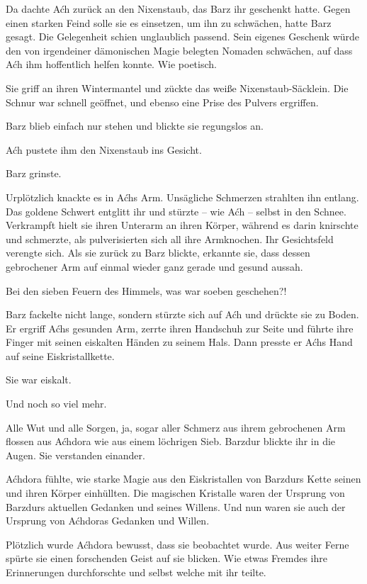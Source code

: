 Da dachte Aćh zurück an den Nixenstaub, das Barz ihr geschenkt hatte. Gegen einen starken Feind solle sie es einsetzen, um ihn zu schwächen, hatte Barz gesagt. Die Gelegenheit schien unglaublich passend. Sein eigenes Geschenk würde den von irgendeiner dämonischen Magie belegten Nomaden schwächen, auf dass Aćh ihm hoffentlich helfen konnte. Wie poetisch.

Sie griff an ihren Wintermantel und zückte das weiße Nixenstaub-Säcklein. Die Schnur war schnell geöffnet, und ebenso eine Prise des Pulvers ergriffen.

Barz blieb einfach nur stehen und blickte sie regungslos an.

Aćh pustete ihm den Nixenstaub ins Gesicht.

Barz grinste.

Urplötzlich knackte es in Aćhs Arm. Unsägliche Schmerzen strahlten ihn entlang. Das goldene Schwert entglitt ihr und stürzte – wie Aćh – selbst in den Schnee. Verkrampft hielt sie ihren Unterarm an ihren Körper, während es darin knirschte und schmerzte, als pulverisierten sich all ihre Armknochen. Ihr Gesichtsfeld verengte sich. Als sie zurück zu Barz blickte, erkannte sie, dass dessen gebrochener Arm auf einmal wieder ganz gerade und gesund aussah.

Bei den sieben Feuern des Himmels, was war soeben geschehen?!

Barz fackelte nicht lange, sondern stürzte sich auf Aćh und drückte sie zu Boden. Er ergriff Aćhs gesunden Arm, zerrte ihren Handschuh zur Seite und führte ihre Finger mit seinen eiskalten Händen zu seinem Hals. Dann presste er Aćhs Hand auf seine Eiskristallkette.

Sie war eiskalt.

Und noch so viel mehr.



\trennzeichen



Alle Wut und alle Sorgen, ja, sogar aller Schmerz aus ihrem gebrochenen Arm flossen aus Aćhdora wie aus einem löchrigen Sieb. Barzdur blickte ihr in die Augen. Sie verstanden einander.

Aćhdora fühlte, wie starke Magie aus den Eiskristallen von Barzdurs Kette seinen und ihren Körper einhüllten. Die magischen Kristalle waren der Ursprung von Barzdurs aktuellen Gedanken und seines Willens. Und nun waren sie auch der Ursprung von Aćhdoras Gedanken und Willen.

Plötzlich wurde Aćhdora bewusst, dass sie beobachtet wurde. Aus weiter Ferne spürte sie einen forschenden Geist auf sie blicken. Wie etwas Fremdes ihre Erinnerungen durchforschte und selbst welche mit ihr teilte.

